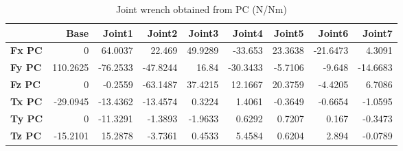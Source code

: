 \begin{table}[h!]
	\centering
	\caption{Joint wrench obtained from PC (N/Nm)}
	\label{wrech_PC_Pose2}
	\begin{tabular}{|l|r|r|r|r|r|r|r|r|}
		\hline
		\textbf{}  & \textbf{Base} & \textbf{Joint1}  & \textbf{Joint2}  & \textbf{Joint3}  & \textbf{Joint4}  & \textbf{Joint5}  & \textbf{Joint6}  & \textbf{Joint7} \\ \hline
		\textbf{Fx PC}  & 0        & 64.0037        & 22.469        & 49.9289        & -33.653        & 23.3638        & -21.6473        & 4.3091 \\ \hline
		\textbf{Fy PC}  & 110.2625        & -76.2533        & -47.8244        & 16.84        & -30.3433        & -5.7106        & -9.648        & -14.6683 \\ \hline
		\textbf{Fz PC}  & 0        & -0.2559        & -63.1487        & 37.4215        & 12.1667        & 20.3759        & -4.4205        & 6.7086 \\ \hline
		\textbf{Tx PC}  & -29.0945        & -13.4362        & -13.4574        & 0.3224        & 1.4061        & -0.3649        & -0.6654        & -1.0595 \\ \hline
		\textbf{Ty PC}  & 0        & -11.3291        & -1.3893        & -1.9633        & 0.6292        & 0.7207        & 0.167        & -0.3473 \\ \hline
		\textbf{Tz PC}  & -15.2101        & 15.2878        & -3.7361        & 0.4533        & 5.4584        & 0.6204        & 2.894        & -0.0789 \\ \hline
	\end{tabular}
\end{table}

